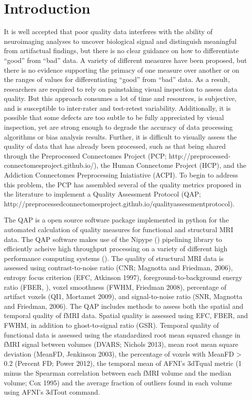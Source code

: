 \section{Introduction}
\label{intro}
It is well accepted that poor quality data interferes with the ability of neuroimaging analyses to uncover biological signal and distinguish meaningful from artifactual findings, but there is no clear guidance on how to differentiate “good” from “bad” data. A variety of different measures have been proposed, but there is no evidence supporting the primacy of one measure over another or on the ranges of values for differentiating “good” from “bad” data. As a result, researchers are required to rely on painstaking visual inspection to assess data quality. But this approach consumes a lot of time and resources, is subjective, and is susceptible to inter-­rater and test-­retest variability. Additionally, it is possible that some defects are too subtle to be fully appreciated by visual inspection, yet are strong enough to degrade the accuracy of data processing algorithms or bias analysis results. Further, it is difficult to visually assess the quality of data that has already been processed, such as that being shared through the Preprocessed Connectomes Project (PCP; http://preprocessed­connectomes­project.github.io/), the Human Connectome Project (HCP), and the Addiction Connectomes Preprocessing Iniatiative (ACPI). To begin to address this problem, the PCP has assembled several of the quality metrics proposed in the literature to implement a Quality Assessment Protocol (QAP; http://preprocessed­connectomes­project.github.io/quality­assessment­protocol).

The QAP is a open source software package implemented in python for the automated calculation of quality measures for functional and structural MRI data. The QAP software makes use of the Nipype () pipelining library to efficiently acheive high throughput processing on a variety of different high performance computing systems (). The quality of structural MRI data is assessed using contrast-­to-­noise ratio (CNR; Magnotta and Friedman, 2006), entropy focus criterion (EFC, Atkinson 1997), foreground-­to-­background energy ratio (FBER, ), voxel smoothness (FWHM, Friedman 2008), percentage of artifact voxels (QI1, Mortamet 2009), and signal­-to-­noise ratio (SNR, Magnotta and Friedman, 2006). The QAP includes methods to assess both the spatial and temporal quality of fMRI data. Spatial quality is assessed using EFC, FBER, and FWHM, in addition to ghost-­to-­signal ratio (GSR). Temporal quality of functional data is assessed using the standardized root mean squared change in fMRI signal between volumes (DVARS; Nichols 2013), mean root mean square deviation (MeanFD, Jenkinson 2003), the percentage of voxels with MeanFD > 0.2 (Percent FD; Power 2012), the temporal mean of AFNI’s 3dTqual metric (1 minus the Spearman correlation between each fMRI volume and the median volume; Cox 1995) and the average fraction of outliers found in each volume using AFNI’s 3dTout command.

